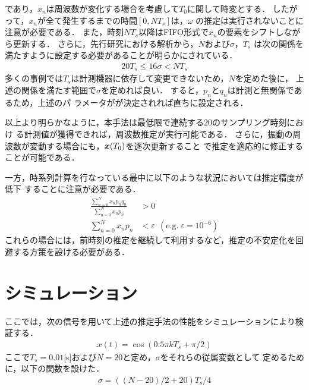 \documentclass[usejistfm]{sice}
\def\vec#1{\mbox{\boldmath$#1$}}
\begin{document}
であり，$x_n$は周波数が変化する場合を考慮して$T_0$に関して時変とする．
したがって，$x_n$が全て発生するまでの時間$[0,NT_s]$は，$\omega$
の推定は実行されないことに注意が必要である．
また，時刻$NT_s$以降はFIFO形式で$x_n$の要素をシフトしながら更新する．
%
さらに，先行研究における解析から，$N$および$\sigma$，$T_s$
は次の関係を満たすように設定する必要があることが明らかにされている．
\begin{align}
 20T_s \leq 16\sigma < NT_s
\end{align}
多くの事例では$T_s$は計測機器に依存して変更できないため，$N$を定めた後に，
上述の関係を満たす範囲で$\sigma$を定めれば良い．
すると，$p_n$と$q_n$は計測と無関係であるため，上述のパ
ラメータがが決定されれば直ちに設定される．

以上より明らかなように，本手法は最低限で連続する20のサンプリング時刻におけ
る計測値が獲得できれば，周波数推定が実行可能である．
%
さらに，振動の周波数が変動する場合にも，$\vec{x}(T_0)$を逐次更新すること
で推定を適応的に修正することが可能である．

一方，時系列計算を行なっている最中に以下のような状況においては推定精度が低下
することに注意が必要である．
\begin{align}
 \frac{\sum^{N}_{n=0}x_np_nq_n}{\sum^{N}_{n=0}x_np_n}&>0\\
 \sum^{N}_{n=0}x_np_n&<\varepsilon \ \ (\mbox{e.g.}\  \varepsilon=10^{-6})
\end{align}
これらの場合には，前時刻の推定を継続して利用するなど，推定の不安定化を回
避する方策を設ける必要がある．


\section{シミュレーション}

%

ここでは，次の信号を用いて上述の推定手法の性能をシミュレーションにより検
証する．
\begin{align}
 x(t)=\cos(0.5\pi kT_s+\pi/2)
\end{align}
ここで$T_s=0.01$[s]および$N=20$と定め，$\sigma$をそれらの従属変数として
定めるために，以下の関数を設けた．
\begin{align}
\sigma=((N-20)/2+20)T_s/4
\end{align}
\end{document}
